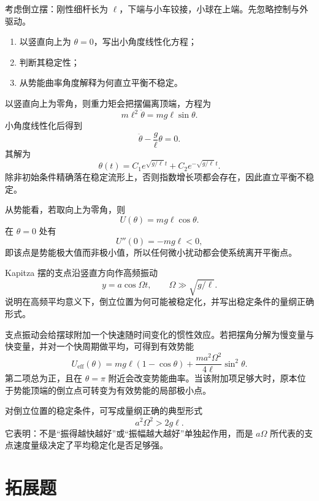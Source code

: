\begin{university}
考虑倒立摆：刚性细杆长为 $\ell$，下端与小车铰接，小球在上端。先忽略控制与外驱动。
\begin{enumerate}
  \item 以竖直向上为 $\theta=0$，写出小角度线性化方程；
  \item 判断其稳定性；
  \item 从势能曲率角度解释为何直立平衡不稳定。
\end{enumerate}
\begin{solution}
以竖直向上为零角，则重力矩会把摆偏离顶端，方程为
\[
m\ell^2\ddot\theta=mg\ell\sin\theta.
\]
小角度线性化后得到
\[
\ddot\theta-\frac{g}{\ell}\theta=0.
\]
其解为
\[
\theta(t)=C_1 e^{\sqrt{g/\ell}\,t}+C_2 e^{-\sqrt{g/\ell}\,t}.
\]
除非初始条件精确落在稳定流形上，否则指数增长项都会存在，因此直立平衡不稳定。

从势能看，若取向上为零角，则
\[
U(\theta)=mg\ell\cos\theta.
\]
在 $\theta=0$ 处有
\[
U''(0)=-mg\ell<0,
\]
即该点是势能极大值而非极小值，所以任何微小扰动都会使系统离开平衡点。
\end{solution}
\end{university}

\begin{university}
Kapitza 摆的支点沿竖直方向作高频振动
\[
y=a\cos\Omega t,
\qquad \Omega\gg \sqrt{g/\ell}.
\]
说明在高频平均意义下，倒立位置为何可能被稳定化，并写出稳定条件的量纲正确形式。
\begin{solution}
支点振动会给摆球附加一个快速随时间变化的惯性效应。若把摆角分解为慢变量与快变量，并对一个快周期做平均，可得到有效势能
\[
U_{\text{eff}}(\theta)=mg\ell(1-\cos\theta)+\frac{ma^2\Omega^2}{4\ell}\sin^2\theta.
\]
第二项总为正，且在 $\theta=\pi$ 附近会改变势能曲率。当该附加项足够大时，原本位于势能顶端的倒立点可转变为有效势能的局部极小点。

对倒立位置的稳定条件，可写成量纲正确的典型形式
\[
a^2\Omega^2>2g\ell.
\]
它表明：不是“振得越快越好”或“振幅越大越好”单独起作用，而是 $a\Omega$ 所代表的支点速度量级决定了平均稳定化是否足够强。
\end{solution}
\end{university}

\section{拓展题}

